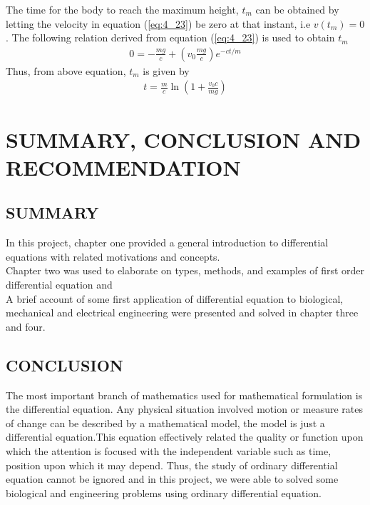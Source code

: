 \documentclass[11pt]{report}
\newcommand{\refn}[1]{(\ref{#1})}
\newcommand{\refx}[1]{\refn{eq:#1}}
\newcommand{\NI}{\noindent}
\begin{document}
	\NI The time for the body to reach the maximum height, $t_m$ can be obtained by letting the velocity in equation \refx{4_23} be zero at that instant, i.e $v(t_m)=0$. The following relation derived from equation \refx{4_23} is used to obtain $t_m$
	\begin{eqnarray*}
		0 = -\frac{mg}{c}+\left(v_0\frac{mg}{c}\right)e^{-ct/m}
	\end{eqnarray*}
	Thus, from above equation, $t_m$ is given by
	\begin{eqnarray}
		t = \frac{m}{c}\ln\left(1 + \frac{v_0 c}{mg}\right)
	\end{eqnarray}

	\chapter{SUMMARY, CONCLUSION AND RECOMMENDATION}
	\section{SUMMARY}
	In this project, chapter one provided a general introduction to differential equations with related motivations and concepts.\\
	
	\NI Chapter two was used to elaborate on types, methods, and examples of first order differential equation and\\
	
	\NI A brief account of some first application of differential equation to biological, mechanical and electrical engineering were presented and solved in chapter three and four.
	
	
	\section{CONCLUSION}
	The most important branch of mathematics used for mathematical formulation is the differential equation.  Any physical situation involved motion or measure rates of change can be described by a mathematical model, the model is just a differential equation.This equation effectively related the quality or function upon which the attention is focused with the independent variable such as time, position upon which it may depend. Thus, the study of ordinary differential equation cannot be ignored and in this project, we were able to solved some biological and engineering problems using ordinary differential equation.\\
	
\end{document}
